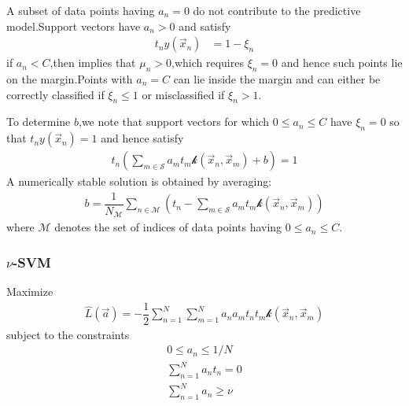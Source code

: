 A subset of data points having $a_n =0$ do not contribute to the predictive model.Support vectors have $a_n > 0$ and satisfy
\begin{align}
t_n y(\vec{x}_n) &= 1-\xi_n
\end{align}
if $a_n <C$,then implies that $\mu_n > 0$,which requires $\xi_n =0$ and hence such points lie on the margin.Points with $a_n=C$ can lie inside the margin and can either be correctly classified if $\xi_n \leq 1$ or misclassified if $\xi_n >1$.

To determine $b$,we note that support vectors for which $0\leq a_n \leq C$ have $\xi_n =0$ so that $t_n y(\vec{x}_n)=1$ and hence satisfy
\begin{align}
t_n(\sum_{m\in\mathcal{S}}a_m t_m \mathcal{k}(\vec{x}_n,\vec{x}_m)+b) =1
\end{align}
A numerically stable solution is obtained by averaging:
\begin{align}
	b=\dfrac{1}{N_{\mathcal{M}}}\sum_{n\in\mathcal{M}} (t_n - \sum_{m\in\mathcal{S}}a_m t_m \mathcal{k}(\vec{x}_n,\vec{x}_m))
\end{align}
where $\mathcal{M}$ denotes the set of indices of data points having $0\leq a_n \leq C$.

\subsubsection{$\nu$-SVM}
Maximize
\begin{align}
\hat{L}(\vec{a})=-\dfrac{1}{2}\sum_{n=1}^{N}\sum_{m=1}^{N}a_n a_m t_n t_m\mathcal{k}(\vec{x}_n,\vec{x}_m)
\end{align}
subject to the constraints
\begin{align}
0\leq a_n \leq 1/N\\
\sum_{n=1}^{N}a_n t_n = 0 \\
\sum_{n=1}^{N}a_n \geq \nu
\end{align}







